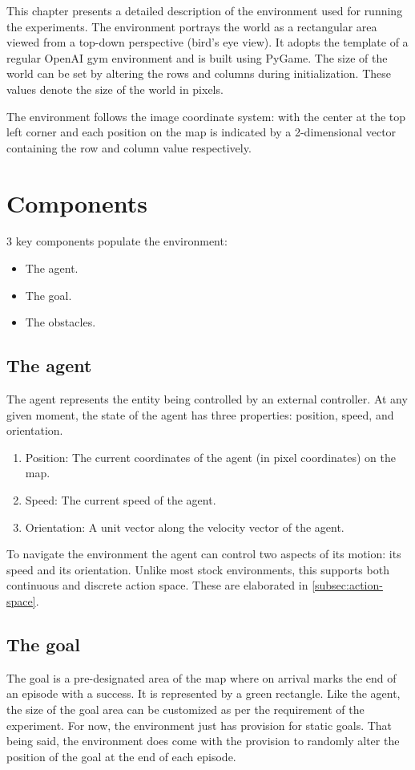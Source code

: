 \label{ch:enviornment}
This chapter presents a detailed description of the environment used for running the experiments. The environment portrays the world as a rectangular area viewed from a top-down perspective (bird's eye view). It adopts the template of a regular OpenAI gym environment and is built using PyGame.
The size of the world can be set by altering the rows and columns during initialization. These values denote the size of the world in pixels.

The environment follows the image coordinate system: with the center at the top left corner and each position on the map is indicated by a 2-dimensional vector containing the row and column value respectively.\\
\section{Components}
3 key components populate the environment: 
\begin{itemize}
    \item The agent.
    \item The goal.
    \item The obstacles.
\end{itemize}
\subsection{The agent}
The agent represents the entity being controlled by an external controller. At any given moment, the state of the agent has three properties: position, speed, and orientation.
\begin{enumerate}
    \item Position: The current coordinates of the agent (in pixel coordinates) on the map.
    \item Speed: The current speed of the agent.
    \item Orientation: A unit vector along the velocity vector of the agent.
\end{enumerate}
To navigate the environment the agent can control two aspects of its motion: its speed and its orientation.
Unlike most stock environments, this supports both continuous and discrete action space. These are elaborated in \autoref{subsec:action-space}.
\subsection{The goal}
The goal is a pre-designated area of the map where on arrival marks the end of an episode with a success. It is represented by a green rectangle. Like the agent, the size of the goal area can be customized as per the requirement of the experiment. For now, the environment just has provision for static goals. That being said, the environment does come with the provision to randomly alter the position of the goal at the end of each episode.


